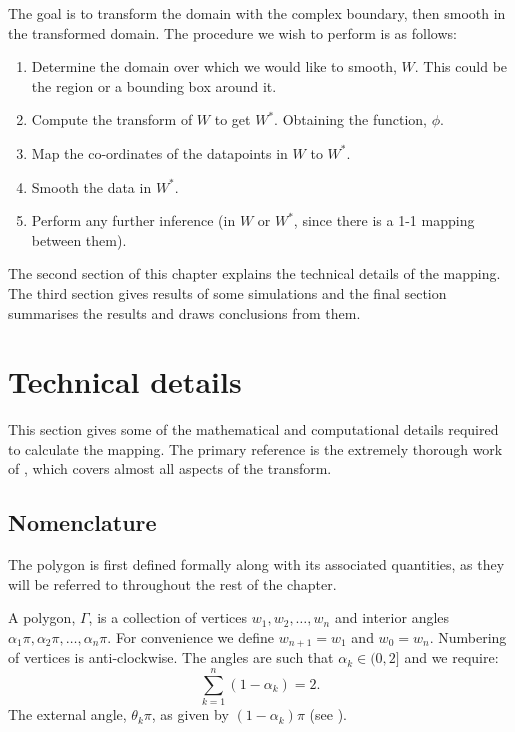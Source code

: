 The goal is to transform the domain with the complex boundary, then smooth in the transformed domain. The procedure we wish to perform is as follows:

\begin{enumerate}
\item Determine the domain over which we would like to smooth, $W$. This could be the region or a bounding box around it.

\item Compute the \sch transform of $W$ to get $W^*$. Obtaining the function, $\phi$.

\item Map the co-ordinates of the datapoints in $W$ to $W^*$.

\item Smooth the data in $W^*$.

\item Perform any further inference (in $W$ or $W^*$, since there is a 1-1 mapping between them).
\end{enumerate}

The second section of this chapter explains the technical details of the mapping. The third section gives results of some simulations and the final section summarises the results and draws conclusions from them.

\section{Technical details}

This section gives some of the mathematical and computational details required to calculate the \sch mapping. The primary reference is the extremely thorough work of \cite{driscoll}, which covers almost all aspects of the \sch transform.

\subsection{Nomenclature}

The polygon is first defined formally along with its associated quantities, as they will be referred to throughout the rest of the chapter.

A polygon, $\Gamma$, is a collection of vertices $w_1, w_2,\dots,w_n$ and interior angles $\alpha_1\pi, \alpha_2\pi, \dots, \alpha_n\pi$. For convenience we define $w_{n+1} = w_1$ and $w_0=w_n$. Numbering of vertices is anti-clockwise. The angles are such that $\alpha_k \in (0,2]$ and we require:
\begin{equation}
\sum_{k=1}^n (1-\alpha_k) = 2.
\end{equation}
The external angle, $\theta_k\pi$, as given by $(1-\alpha_k)\pi$ (see ).

